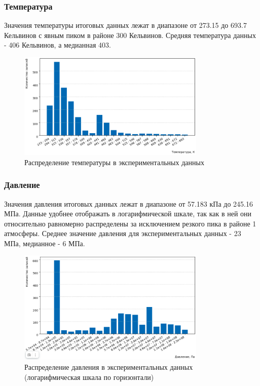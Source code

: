 \documentclass[a4paper,12pt]{article}
\begin{document}
    \subsubsection{Температура}
      Значения температуры итоговых данных лежат в диапазоне от 273.15 до 693.7 Кельвинов с явным пиком в районе 300 Кельвинов. Средняя температура данных - 406 Кельвинов, а медианная 403.
      \begin{figure}[ht]
        \centering
        \includegraphics[width=0.8\textwidth]{data_distribution_temperature.png}
        \caption{Распределение температуры в экспериментальных данных}
        \label{fig:data_distribution_temperature}
      \end{figure}

    \subsubsection{Давление}
      Значения давления итоговых данных лежат в диапазоне от 57.183 кПа до 245.16 МПа. Данные удобнее отображать в логарифмической шкале, так как в ней они относительно равномерно распределены за исключением резкого пика в районе 1 атмосферы. Среднее значение давления для экспериментальных данных - 23 МПа, медианное - 6 МПа.
      \begin{figure}[ht]
        \centering
        \includegraphics[width=0.8\textwidth]{data_distribution_pressure.png}
        \caption{Распределение давления в экспериментальных данных (логарифмическая шкала по горизонтали)}
        \label{fig:data_distribution_pressure}
      \end{figure}
\end{document}
